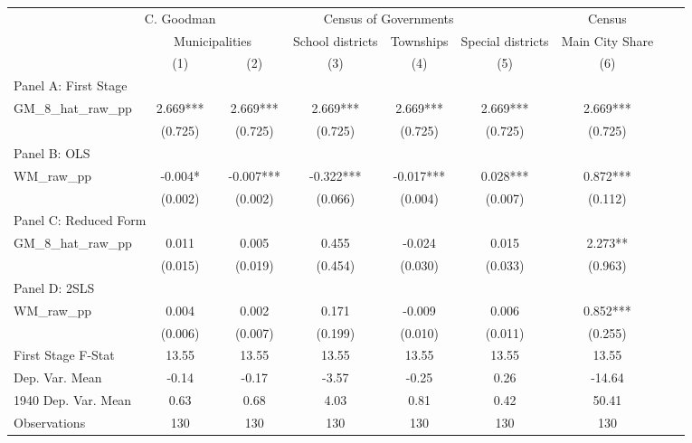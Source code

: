  \begin{tabular}{l*{8}{c}} \toprule
&\multicolumn{1}{c}{C. Goodman}&\multicolumn{4}{c}{Census of Governments}&\multicolumn{1}{c}{Census}\\\cmidrule(lr){2-2}\cmidrule(lr){3-6}\cmidrule(lr){7-7}
&\multicolumn{2}{c}{Municipalities}&\multicolumn{1}{c}{School districts}&\multicolumn{1}{c}{Townships}&\multicolumn{1}{c}{Special districts}&\multicolumn{1}{c}{Main City Share}\\\cmidrule(lr){2-3}\cmidrule(lr){4-6}\cmidrule(lr){7-7}
&\multicolumn{1}{c}{(1)}&\multicolumn{1}{c}{(2)}&\multicolumn{1}{c}{(3)}&\multicolumn{1}{c}{(4)}&\multicolumn{1}{c}{(5)}&\multicolumn{1}{c}{(6)}\\
\cmidrule(lr){1-7}
\multicolumn{6}{l}{Panel A: First Stage}\\
\cmidrule(lr){1-7}
GM\_8\_hat\_raw\_pp &    2.669***&    2.669***&    2.669***&    2.669***&    2.669***&    2.669***\\
                &  (0.725)   &  (0.725)   &  (0.725)   &  (0.725)   &  (0.725)   &  (0.725)   \\
\cmidrule(lr){1-7}
\multicolumn{6}{l}{Panel B: OLS}\\
\cmidrule(lr){1-7}
WM\_raw\_pp       &   -0.004*  &   -0.007***&   -0.322***&   -0.017***&    0.028***&    0.872***\\
                &  (0.002)   &  (0.002)   &  (0.066)   &  (0.004)   &  (0.007)   &  (0.112)   \\
\cmidrule(lr){1-7}
\multicolumn{6}{l}{Panel C: Reduced Form}\\
\cmidrule(lr){1-7}
GM\_8\_hat\_raw\_pp &    0.011   &    0.005   &    0.455   &   -0.024   &    0.015   &    2.273** \\
                &  (0.015)   &  (0.019)   &  (0.454)   &  (0.030)   &  (0.033)   &  (0.963)   \\
\cmidrule(lr){1-7}
\multicolumn{6}{l}{Panel D: 2SLS}\\
\cmidrule(lr){1-7}
WM\_raw\_pp       &    0.004   &    0.002   &    0.171   &   -0.009   &    0.006   &    0.852***\\
                &  (0.006)   &  (0.007)   &  (0.199)   &  (0.010)   &  (0.011)   &  (0.255)   \\
\midrule
First Stage F-Stat&    13.55   &    13.55   &    13.55   &    13.55   &    13.55   &    13.55   \\
Dep. Var. Mean  &    -0.14   &    -0.17   &    -3.57   &    -0.25   &     0.26   &   -14.64   \\
1940 Dep. Var. Mean&     0.63   &     0.68   &     4.03   &     0.81   &     0.42   &    50.41   \\
Observations    &      130   &      130   &      130   &      130   &      130   &      130   \\
       \bottomrule \end{tabular}
